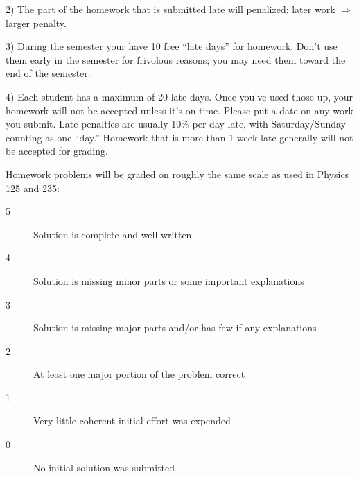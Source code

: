 \documentclass[12pt]{article}
\begin{document}
2) The part of the homework that is submitted late will penalized; later work $\Rightarrow$ larger penalty. 

3) During the semester your have 10 free ``late days'' for homework.
Don't use them early in the semester for frivolous reasons; you may
need them toward the end of the semester.   

4) Each student has a maximum of 20 late days.  Once you’ve used those
up, your homework will not be accepted unless it’s on time. Please put
a date on any work you submit.  Late penalties are usually 10\% per
day late, with Saturday/Sunday counting as one ``day.''   Homework
that is more than 1 week late generally will not be accepted for
grading.



\newpage
Homework problems will be graded on roughly the same scale as used in
Physics 125 and 235:

\begin{description}
  \item[5] Solution is complete and well-written
  \item[4] Solution is missing minor parts or some important explanations
  \item[3] Solution is missing major parts and/or has few if any explanations
  \item[2] At least one major portion of the problem correct
  \item[1] Very little coherent initial effort was expended
  \item[0] No initial solution was submitted
\end{description}
\end{document}
